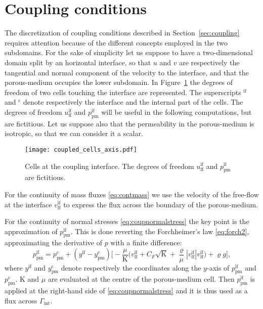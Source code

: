 \section{Coupling conditions}
The discretization of coupling conditions described in 
Section~\ref{sec:coupling} requires attention because of the different concepts 
employed in the two subdomains. For the sake of simplicity let us suppose to 
have a two-dimensional domain split by an horizontal interface, so that $u$ and 
$v$ are respectively the tangential and normal component of the velocity to the 
interface, and that the porous-medium occupies the lower subdomain. In 
Figure~\ref{fig:coupledcells} the degrees of freedom of two cells touching 
the interface are represented. The superscripts $^\text{if}$ and $^\text{c}$ 
denote respectively the interface and the internal part of the cells. The 
degrees of freedom $u_\text{ff}^\text{if}$ and $p_\text{pm}^\text{if}$ will be 
useful in the following computations, but are fictitious. Let us suppose also 
that the permeability in the porous-medium is isotropic, so that we can 
consider it a scalar.
\begin{figure}
	\centering
	\texttt{[image: coupled\_cells\_axis.pdf]}
	\caption[Cells at the coupling interface]{Cells at the coupling interface. 
	The degrees of freedom $u_\text{ff}^\text{if}$ and $p_\text{pm}^\text{if}$ 
	are fictitious.}
	\label{fig:coupledcells}
\end{figure}

For the continuity of mass fluxes \eqref{eq:contmass} we use the velocity of 
the free-flow at the interface $v_\text{ff}^\text{if}$ to express the flux 
across the boundary of the porous-medium.

For the continuity of normal stresses \eqref{eq:coupnormalstress} the key point 
is the approximation of $p_\text{pm}^\text{if}$. This is done reverting 
the Forchheimer's law \eqref{eq:forch2}, approximating the derivative of $p$ 
with a finite difference:
\begin{equation}
	p_\text{pm}^\text{if} = 
	p_\text{pm}^\text{c}+(y^\text{if}-y_\text{pm}^\text{c}) 
	\Big[-\frac{\mu}{\mathrm{K}}\big(v_\text{ff}^\text{if} 
	+C_F\sqrt{\mathrm{K}}+ 
	\frac{\varrho}{\mu}|v_\text{ff}^\text{if}| 
	v_\text{ff}^\text{if}\big)+\varrho
	 g\Big],
\end{equation}
where $y^\text{if}$ and $y^\text{c}_\text{pm}$ denote respectively the coordinates along the $y$-axis of $p^\text{if}_\text{pm}$ and $p^\text{c}_\text{pm}$.
$\mathrm{K}$ and $\mu$ are evaluated at the centre of the porous-medium cell. 
Then $p_\text{pm}^\text{if}$ is applied at the right-hand side of 
\eqref{eq:coupnormalstress} and it is thus used as a flux across 
$\Gamma_\text{int}$.

